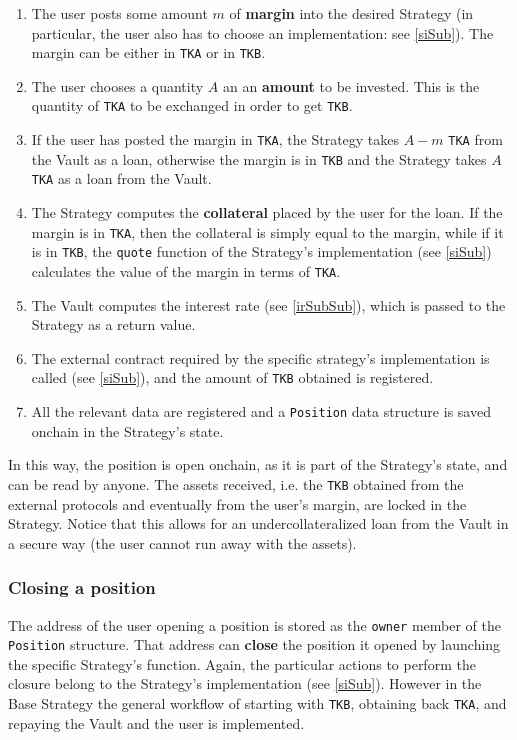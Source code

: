 \documentclass[a4paper,10 pt]{article}
\theoremstyle{definition}
\begin{document}
\begin{enumerate}
\item The user posts some amount $m$ of {\bf margin} into the desired Strategy (in particular, the user also has to choose an implementation: see \ref{siSub}). The margin can be either in \verb|TKA| or in \verb|TKB|.
\item The user chooses a quantity $A$ an an {\bf amount} to be invested. This is the quantity of \verb|TKA| to be exchanged in order to get \verb|TKB|.
\item If the user has posted the margin in \verb|TKA|, the Strategy takes $A-m$ \verb|TKA| from the Vault as a loan, otherwise the margin is in \verb|TKB| and the Strategy takes $A$ \verb|TKA| as a loan from the Vault.
\item The Strategy computes the {\bf collateral} placed by the user for the loan. If the margin is in \verb|TKA|, then the collateral is simply equal to the margin, while if it is in \verb|TKB|, the \verb|quote| function of the Strategy's implementation (see \ref{siSub}) calculates the value of the margin in terms of \verb|TKA|.
\item The Vault computes the interest rate (see \ref{irSubSub}), which is passed to the Strategy as a return value.
\item The external contract required by the specific strategy's implementation is called (see \ref{siSub}), and the amount of \verb|TKB| obtained is registered.
\item All the relevant data are registered and a \verb|Position| data structure is saved onchain in the Strategy's state.
\end{enumerate}

In this way, the position is open onchain, as it is part of the Strategy's state, and can be read by anyone. The assets received, i.e. the \verb|TKB| obtained from the external protocols and eventually from the user's margin, are locked in the Strategy. Notice that this allows for an undercollateralized loan from the Vault in a secure way (the user cannot run away with the assets).

\subsubsection{Closing a position}\label{cpSubSub}

The address of the user opening a position is stored as the \verb|owner| member of the \verb|Position| structure. That address can {\bf close} the position it opened by launching the specific Strategy's function. Again, the particular actions to perform the closure belong to the Strategy's implementation (see \ref{siSub}). However in the Base Strategy the general workflow of starting with \verb|TKB|, obtaining back \verb|TKA|, and repaying the Vault and the user is implemented.
\end{document}
